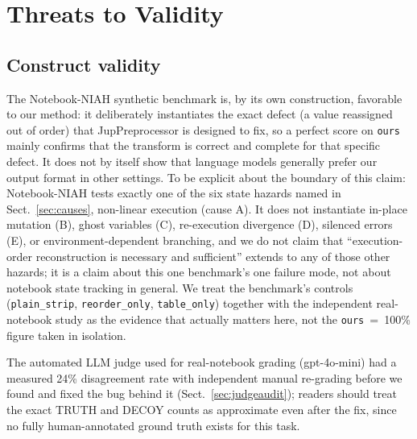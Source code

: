 \documentclass[11pt]{article}
\begin{document}
\section{Threats to Validity}
\label{sec:threats}

\subsection{Construct validity}
The Notebook-NIAH synthetic benchmark is, by its own construction,
favorable to our method: it deliberately instantiates the exact defect
(a value reassigned out of order) that JupPreprocessor is designed to fix,
so a perfect score on \texttt{ours} mainly confirms that the transform is
correct and complete for that specific defect. It does not by itself show
that language models generally prefer our output format in other
settings. To be explicit about the boundary of this claim: Notebook-NIAH
tests exactly one of the six state hazards named in Sect.~\ref{sec:causes},
non-linear execution (cause A). It does not instantiate in-place
mutation (B), ghost variables (C), re-execution divergence (D), silenced
errors (E), or environment-dependent branching, and we do not claim that
``execution-order reconstruction is necessary and sufficient'' extends to
any of those other hazards; it is a claim about this one benchmark's one
failure mode, not about notebook state tracking in general. We treat the benchmark's controls
(\texttt{plain\_strip}, \texttt{reorder\_only}, \texttt{table\_only})
together with the independent real-notebook study as the evidence that
actually matters here, not the \texttt{ours}~=~100\% figure taken in
isolation.

The automated LLM judge used for real-notebook grading (gpt-4o-mini) had
a measured 24\% disagreement rate with independent manual re-grading
before we found and fixed the bug behind it (Sect.~\ref{sec:judgeaudit});
readers should treat the exact TRUTH and DECOY counts as approximate
even after the fix, since no fully human-annotated ground truth exists
for this task.
\end{document}
